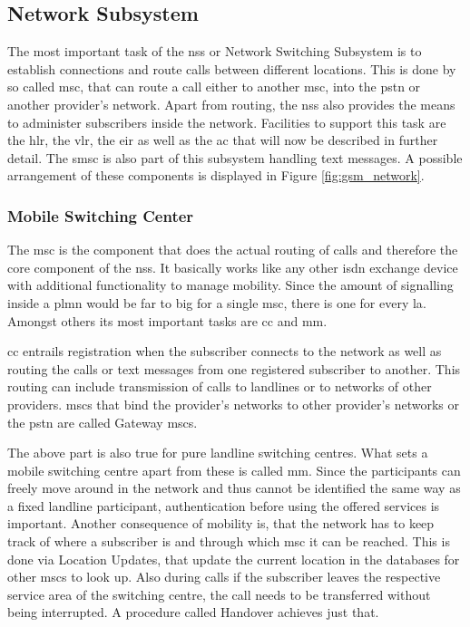 \subsection{Network Subsystem}
\label{sec:nss}
The most important task of the \gls{nss} or Network Switching Subsystem is to establish connections and route calls between different locations.
This is done by so called \gls{msc}, that can route a call either to another \gls{msc}, into the \gls{pstn} or another provider's network.
Apart from routing, the \gls{nss} also provides the means to administer subscribers inside the network.
Facilities to support this task are the \gls{hlr}, the \gls{vlr}, the \gls{eir} as well as the \gls{ac} that will now be described in further detail.
The \gls{smsc} is also part of this subsystem handling text messages.
A possible arrangement of these components is displayed in Figure \ref{fig:gsm_network}.

\subsubsection{Mobile Switching Center}
The \gls{msc} is the component that does the actual routing of calls and therefore the core component of the \gls{nss}.
It basically works like any other \gls{isdn} exchange device with additional functionality to manage mobility.
Since the amount of signalling inside a \gls{plmn} would be far to big for a single \gls{msc}, there is one for every \gls{la}.
Amongst others its most important tasks are \gls{cc} and \gls{mm}.

\gls{cc} entrails registration when the subscriber connects to the network as well as routing the calls or text messages from one registered subscriber to another. 
This routing can include transmission of calls to landlines or to networks of other providers.
\glspl{msc} that bind the provider's networks to other provider's networks or the \gls{pstn} are called Gateway \glspl{msc}.

The above part is also true for pure landline switching centres.
What sets a mobile switching centre apart from these is called \gls{mm}.
Since the participants can freely move around in the network  and thus cannot be identified the same way as a fixed landline participant, authentication before using the offered services is important.
Another consequence of mobility is, that the network has to keep track of where a subscriber is and through which \gls{msc} it can be reached.
This is done via  Location Updates, that update the current location in the databases for other \glspl{msc} to look up.
Also during calls if the subscriber leaves the respective service area of the switching centre, the call needs to be transferred without being interrupted.
A procedure called Handover achieves just that.

